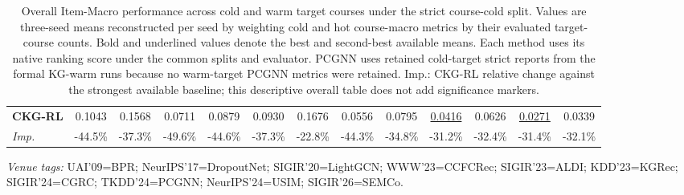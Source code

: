 \begin{table}[t]
{\begin{tabular}{lcccccccccccc}
\midrule
\textbf{CKG-RL} & 0.1043 & 0.1568 & 0.0711 & 0.0879 & 0.0930 & 0.1676 & 0.0556 & 0.0795 & \underline{0.0416} & 0.0626 & \underline{0.0271} & 0.0339 \\
\emph{Imp.} & -44.5\% & -37.3\% & -49.6\% & -44.6\% & -37.3\% & -22.8\% & -44.3\% & -34.8\% & -31.2\% & -32.4\% & -31.4\% & -32.1\% \\
\bottomrule
\end{tabular}
}
\caption{Overall Item-Macro performance across cold and warm target courses under the strict course-cold split. Values are three-seed means reconstructed per seed by weighting cold and hot course-macro metrics by their evaluated target-course counts. Bold and underlined values denote the best and second-best available means. Each method uses its native ranking score under the common splits and evaluator. PCGNN uses retained cold-target strict reports from the formal KG-warm runs because no warm-target PCGNN metrics were retained. Imp.: CKG-RL relative change against the strongest available baseline; this descriptive overall table does not add significance markers.}
\label{tab:overall-item-macro-main}
\vspace{0.2em}
\begin{minipage}{\textwidth}
\scriptsize\emph{Venue tags:} UAI'09=BPR; NeurIPS'17=DropoutNet; SIGIR'20=LightGCN; WWW'23=CCFCRec; SIGIR'23=ALDI; KDD'23=KGRec; SIGIR'24=CGRC; TKDD'24=PCGNN; NeurIPS'24=USIM; SIGIR'26=SEMCo.
\end{minipage}
\end{table}
